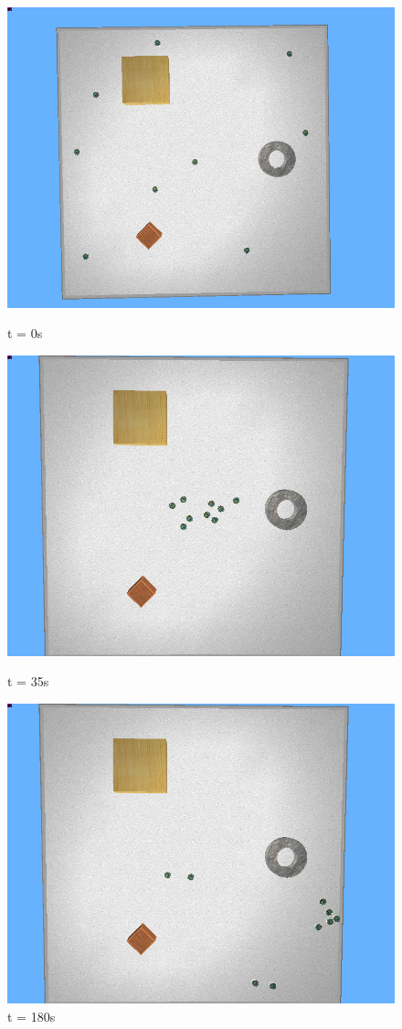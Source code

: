 \begin{figure}[!h]
	\centering
	\begin{minipage}{.5\textwidth}
		\centering
		\includegraphics[width=.75\linewidth]{failure1}
		\caption*{t = 0s}
		\label{fig:sfail1}
	\end{minipage}%
	\begin{minipage}{.5\textwidth}
		\centering
		\includegraphics[width=.75\linewidth]{failure2}
		\caption*{t = 35s}
		\label{fig:fail2}
	\end{minipage}
	\begin{minipage}{.5\textwidth}
		\centering
		\includegraphics[width=.75\linewidth]{failure3}
		\caption*{t = 180s}
		\label{fig:fail3}
	\end{minipage}%
	\label{fig:fail}
\end{figure}

